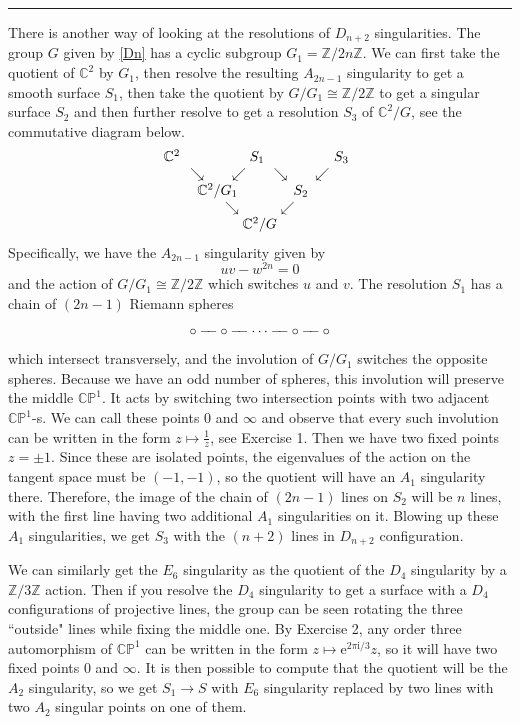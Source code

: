 \documentclass[11pt]{article}
\numberwithin{equation}{section}
\numberwithin{footnote}{section}
\newcommand{\blue}{\color{blue}}
\newcommand{\ee}{{\mathrm e}}
\newcommand{\ii}{{\mathrm i}}
\renewcommand{\P}{{\mathbb P}}
\newcommand{\Z}{{\mathbb Z}}
\newcommand{\C}{{\mathbb C}}
\begin{document}
\smallskip
{\blue \hrule}
There is another way of looking at the resolutions of $D_{n+2}$ singularities. The group $G$ given by \eqref{Dn} has a cyclic subgroup $G_1 = \Z/2n\Z$. We can first take the quotient of $\C^2$ by $G_1$, then resolve the resulting $A_{2n-1}$ singularity
to get a smooth surface $S_1$, then take the quotient by $G/G_1 \cong \Z/2\Z$ to get a singular surface $S_2$ and then further resolve to get a resolution $S_3$ of $\C^2/G$, see the commutative diagram below.
$$
\begin{array}{c}
\C^2\hskip 50pt S_1 \hskip 50pt S_3\hskip 5pt\\
\searrow\hskip 20pt\swarrow\hskip 20pt\searrow\hskip 20pt\swarrow\\
\C^2/G_1\hskip 40pt S_2\hskip 10pt\\
\searrow\hskip 30pt\swarrow\\
\C^2/G\end{array}
$$
Specifically, we have the $A_{2n-1}$ singularity given by 
$$
uv - w^{2n} = 0
$$
and the action of $G/G_1 \cong \Z/2\Z$ which switches $u$ and $v$. The resolution $S_1$ has a chain of $(2n-1)$ Riemann spheres
$$
\circ - \hskip -5pt - \circ - \hskip -5pt - \cdots - \hskip -5pt - \circ - \hskip -5pt - \circ 
$$
which intersect transversely, and the involution of $G/G_1$ switches the opposite spheres. Because we have an odd number of spheres, this involution will preserve the middle $\C\P^1$. It acts by switching two intersection points with two adjacent $\C\P^1$-s. We can call these points $0$ and $\infty$ and observe that every such involution can be written in the form $z\mapsto \frac 1z$, see Exercise 1. Then we have two fixed points $z=\pm 1$. Since these are isolated points, the eigenvalues of the action on the tangent space must be $(-1,-1)$, so the quotient will have an $A_1$ singularity there. Therefore, the image of the chain 
of $(2n-1)$ lines on $S_2$ will be $n$ lines, with the first line having two additional $A_1$ singularities on it. Blowing up these $A_1$ singularities, we get $S_3$ with the $(n+2)$ lines in $D_{n+2}$ configuration.

\smallskip
We can similarly get the $E_6$ singularity as the quotient of the $D_4$ singularity by a $\Z/3\Z$ action. Then if you resolve
the $D_4$ singularity to get a surface with a $D_4$ configurations of projective lines, the group can be seen rotating the 
three ``outside" lines while fixing the middle one. By Exercise 2, any order three automorphism of $\C\P^1$ can be 
written in the form $z\mapsto \ee^{2\pi\ii/3}z$, so it will have two fixed points $0$ and $\infty$. It is then possible to compute that the  quotient will be the $A_2$ singularity, so we get $S_1\to S$ with $E_6$ singularity replaced by two lines with two $A_2$ singular points on one of them. 
\end{document}
